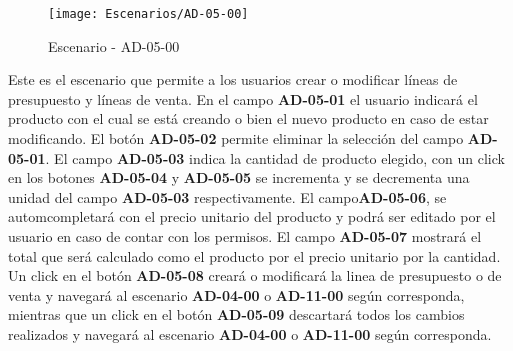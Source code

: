 \begin{figure}[H]
\centering
\texttt{[image: Escenarios/AD-05-00]}
\caption{Escenario - AD-05-00}
\label{fig:AD-05-00}
\end{figure}
Este es el escenario que permite a los usuarios crear o modificar líneas de presupuesto y líneas de venta. En el campo \textbf{AD-05-01} el usuario indicará el producto con el cual se está creando o bien el nuevo producto en caso de estar modificando. El botón \textbf{AD-05-02} permite eliminar la selección del campo \textbf{AD-05-01}. El campo \textbf{AD-05-03} indica la cantidad de producto elegido, con un click en los botones \textbf{AD-05-04} y \textbf{AD-05-05} se incrementa y se decrementa una unidad del campo \textbf{AD-05-03} respectivamente. El campo\textbf{AD-05-06}, se automcompletará con el precio unitario del producto y podrá ser editado por el usuario en caso de contar con los permisos. El campo \textbf{AD-05-07} mostrará el total que será calculado como el producto por el precio unitario por la cantidad.
Un click en el botón \textbf{AD-05-08} creará o modificará la linea de presupuesto o de venta y navegará al escenario \textbf{AD-04-00} o \textbf{AD-11-00} según corresponda, mientras que un click en el botón \textbf{AD-05-09} descartará todos los cambios realizados y navegará al escenario \textbf{AD-04-00} o \textbf{AD-11-00} según corresponda.
\clearpage

